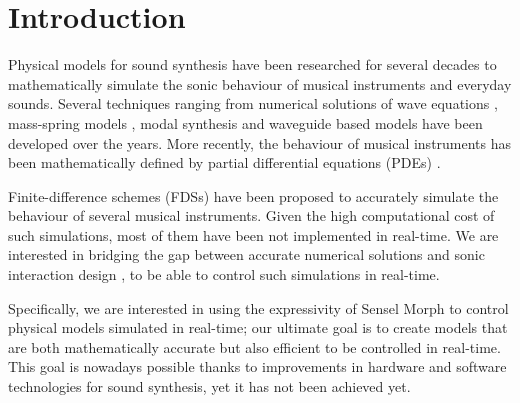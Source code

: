 \documentclass{article}
\title{\papertitle}
\begin{document}
%
\capstartfalse
\maketitle
\capstarttrue
%
\begin{abstract}
In this paper we introduce several physical models of bowed and plucked string instruments which use accurate numerical simulations using partial differential equations but are also efficient enough to run in real-time. We describe the mathematical formulation of these models, the real-time implementation in JUCE, the control using the Sensel Morph interface as well as results from qualitative evaluations from experts.
\end{abstract}
%

\section{Introduction}\label{sec:introduction}

Physical models for sound synthesis have been researched for several decades to mathematically simulate the sonic behaviour of musical instruments and everyday sounds.
Several techniques ranging from numerical solutions of wave equations \cite{hiller1971synthesizing}, mass-spring models \cite{cadoz1993cordis}, modal synthesis \cite{morrison1993mosaic} and waveguide based models \cite{smith1992physical} have been developed over the years.
More recently, the behaviour of musical instruments has been mathematically defined by partial differential equations (PDEs) \cite{Bilbao2018:Tutorial}.

Finite-difference schemes (FDSs) have been proposed to accurately simulate the behaviour of several musical instruments.
Given the high computational cost of such simulations, most of them have been not implemented in real-time. 
We are interested in bridging the gap between accurate numerical solutions and sonic interaction design \cite{franinovic2013sonic}, to be able to control such simulations in real-time. 

Specifically, we are interested in using the expressivity of Sensel Morph \cite{sensel2018} to control physical models simulated in real-time; our ultimate goal is to create models that are both mathematically accurate but also efficient to be controlled in real-time. This goal is nowadays possible thanks to improvements in hardware and software technologies for sound synthesis, yet it has not been achieved yet.
\end{document}
